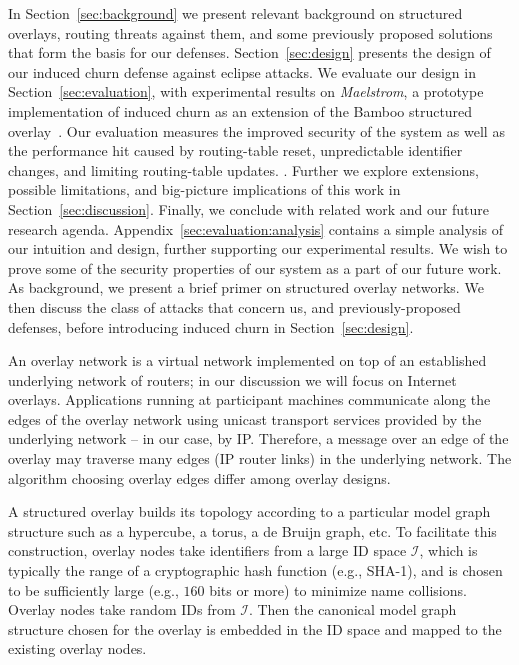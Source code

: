 \documentclass[10pt,twocolumn]{article}
\begin{document}
In Section~\ref{sec:background} we present relevant background on
structured overlays, routing threats against them, and some
previously proposed solutions that form the basis for our defenses.
Section~\ref{sec:design} presents the design of our induced churn
defense against eclipse attacks.  We evaluate our design in
Section~\ref{sec:evaluation}, with experimental results on
\emph{Maelstrom}, a prototype
implementation of induced churn as an extension of the Bamboo structured
overlay~\cite{Rhea2004}. Our evaluation measures the improved security of the system
as well as the performance hit caused by routing-table reset, unpredictable identifier changes, and limiting routing-table updates.
. Further we explore extensions, possible limitations, and big-picture implications
of this work in Section~\ref{sec:discussion}.  Finally, we conclude with
related work and our future research agenda.  
Appendix~\ref{sec:evaluation:analysis} contains a simple analysis of our
intuition and design, further supporting our experimental results. We
wish to prove some of the security properties of our system as a part
of our future work.
\label{sec:background}
As background, we present a brief primer
on structured overlay networks.  We
then discuss the class of attacks that concern us, and previously-proposed
defenses, before introducing induced churn in Section~\ref{sec:design}.


\label{sec:structuredOverlays}
An overlay network is a virtual network implemented on top of an
established underlying network of routers; in our discussion we will
focus on Internet overlays. Applications running at participant
machines communicate along the edges of the overlay network using
unicast transport services provided by the underlying network -- in
our case, by IP. Therefore, a message over an edge of 
the overlay may traverse many edges (IP router links) in the
underlying network. The algorithm choosing overlay
edges differ among overlay designs.

A structured overlay builds its topology according to a particular model
graph
structure such as a hypercube, a torus, a de Bruijn graph, etc.  To
facilitate this construction, overlay nodes take identifiers from a
large ID space $\mathcal{I}$, which is typically the range of a
cryptographic
hash function (e.g., SHA-1), and is chosen to be sufficiently large (e.g.,
$160$ bits or more) to minimize name
collisions.  Overlay nodes take random IDs from $\mathcal{I}$.  Then the canonical model graph structure chosen
for the overlay is embedded in the ID space and mapped to the
existing overlay nodes.
\end{document}
